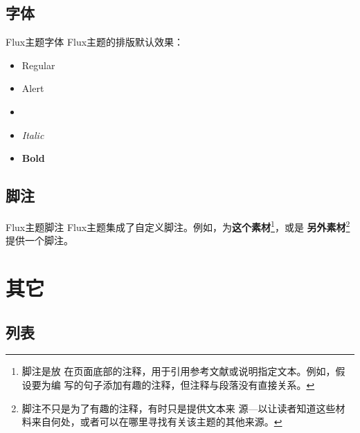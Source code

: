 \documentclass[t, aspectratio=169]{ctexbeamer}
\begin{document}
\subsection{字体}

\begin{frame}[fragile]{Flux主题}{字体}
  Flux主题的排版默认效果：
  \begin{itemize}
  \item Regular
  \item \alert{Alert}
  \item {}
  \item \textit{Italic}
  \item \textbf{Bold}
  \end{itemize}        
\end{frame}

\subsection{脚注}

\begin{frame}{Flux主题}{脚注}
  Flux主题集成了自定义脚注。例如，为\textbf{这个素材}\footnote{脚注是放
    在页面底部的注释，用于引用参考文献或说明指定文本。例如，假设要为编
    写的句子添加有趣的注释，但注释与段落没有直接关系。}，或是
  \textbf{另外素材}\footnote{脚注不只是为了有趣的注释，有时只是提供文本来
    源---以让读者知道这些材料来自何处，或者可以在哪里寻找有关该主题的其他来源。}提供一个脚注。
\end{frame}

\section{其它}
\subsection{列表}
\end{document}

